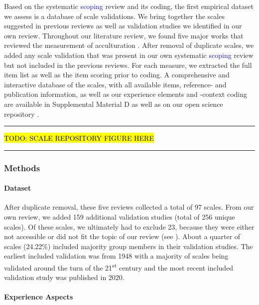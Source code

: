 Based on the systematic \textcolor{blue}{scoping} review and its coding,
the first empirical dataset we assess is a database of scale
validations. We bring together the scales suggested in previous reviews
as well as validation studies we identified in our own review.
Throughout our literature review, we found five major works that
reviewed the measurement of acculturation
\citep{Celenk2011, Maestas2000, Matsudaira2006, Wallace2010, Zane2004}.
After removal of duplicate scales, we added any scale validation that
was present in our own systematic \textcolor{blue}{scoping} review but
not included in the previous reviews. For each measure, we extracted the
full item list as well as the item scoring prior to coding. A
comprehensive and interactive database of the scales, with all available
items, reference- and publication information, as well as our experience
elements and -context coding are available in Supplemental Material D as
well as on our open science repository
\citep[see][]{Kreienkamp2021d, Kreienkamp2021e}.

\begin{center}\rule{0.5\linewidth}{0.5pt}\end{center}

\hl{TODO: SCALE REPOSITORY FIGURE HERE}

\begin{center}\rule{0.5\linewidth}{0.5pt}\end{center}

\subsubsection{Methods}  
\paragraph{Dataset}

After duplicate removal, these five reviews collected a total of 97
scales. From our own review, we added 159 additional validation studies
(total of 256 unique scales). Of these scales, we ultimately had to
exclude 23, because they were either not accessible or did not fit the
topic of our review (see ). About a
quarter of scales (24.22\%) included majority group members in their
validation studies. The earliest included validation was from 1948 with
a majority of scales being validated around the turn of the
21\textsuperscript{st} century and the most recent included validation
study was published in 2020.

\paragraph{Experience Aspects}

